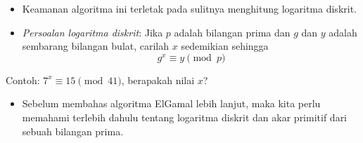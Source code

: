 \documentclass{article}
\begin{document}

\begin{itemize}
    \item Keamanan algoritma ini terletak pada sulitnya menghitung logaritma diskrit.
    \item \textit{Persoalan logaritma diskrit}: Jika $p$ adalah bilangan prima dan $g$ dan $y$ adalah sembarang bilangan bulat, carilah $x$ sedemikian sehingga
    \[ g^x \equiv y \pmod{p} \]
\end{itemize}

Contoh: $7^x \equiv 15 \pmod{41}$, berapakah nilai $x$?

\begin{itemize}
    \item Sebelum membahas algoritma ElGamal lebih lanjut, maka kita perlu memahami terlebih dahulu tentang logaritma diskrit dan akar primitif dari sebuah bilangan prima.
\end{itemize}
\end{document}
